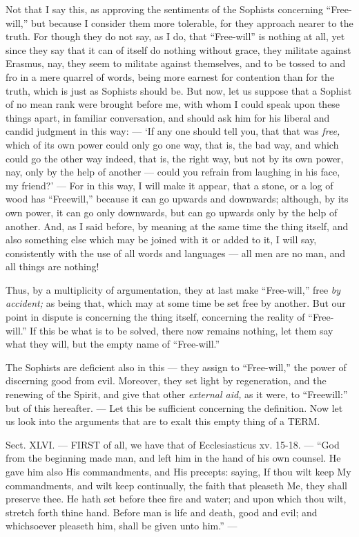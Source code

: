 Not that I say this, as approving the sentiments of the Sophists concerning “Free-will,” but because I consider them more tolerable, for they approach nearer to the truth. For though they do not say, as I do, that “Free-will” is nothing at all, yet since they say that it can of itself do nothing without grace, they militate against Erasmus, nay, they seem to militate against themselves, and to be tossed to and fro in a mere quarrel of words, being more earnest for contention than for the truth, which is just as Sophists should be. But now, let us suppose that a Sophist of no mean rank were brought before me, with whom I could speak upon these things apart, in familiar conversation, and should ask him for his liberal and candid judgment in this way: — ‘If any one should tell you, that that was \emph{free, }which of its own power could only go one way, that is, the bad way, and which could go the other way indeed, that is, the right way, but not by its own power, nay, only by the help of another — could you refrain from laughing in his face, my friend?’ — For in this way, I will make it appear, that a stone, or a log of wood has “Freewill,” because it can go upwards and downwards; although, by its own power, it can go only downwards, but can go upwards only by the help of another. And, as I said before, by meaning at the same time the thing itself, and also something else which may be joined with it or added to it, I will say, consistently with the use of all words and languages — all men are no man, and all things are nothing!

Thus, by a multiplicity of argumentation, they at last make “Free-will,” free \emph{by accident; }as being that, which may at some time be set free by another. But our point in dispute is concerning the thing itself, concerning the reality of “Free-will.” If this be what is to be solved, there now remains nothing, let them say what they will, but the empty name of “Free-will.”

The Sophists are deficient also in this — they assign to “Free-will,” the power of discerning good from evil. Moreover, they set light by regeneration, and the renewing of the Spirit, and give that other \emph{external aid, }as it were, to “Freewill:” but of this hereafter. — Let this be sufficient concerning the definition. Now let us look into the arguments that are to exalt this empty thing of a \textsc{TERM}.


Sect. XLVI. — FIRST of all, we have that of Ecclesiasticus xv. 15-18. — “God from the beginning made man, and left him in the hand of his own counsel. He gave him also His commandments, and His precepts: saying, If thou wilt keep My commandments, and wilt keep continually, the faith that pleaseth Me, they shall preserve thee. He hath set before thee fire and water; and upon which thou wilt, stretch forth thine hand. Before man is life and death, good and evil; and whichsoever pleaseth him, shall be given unto him.” —


